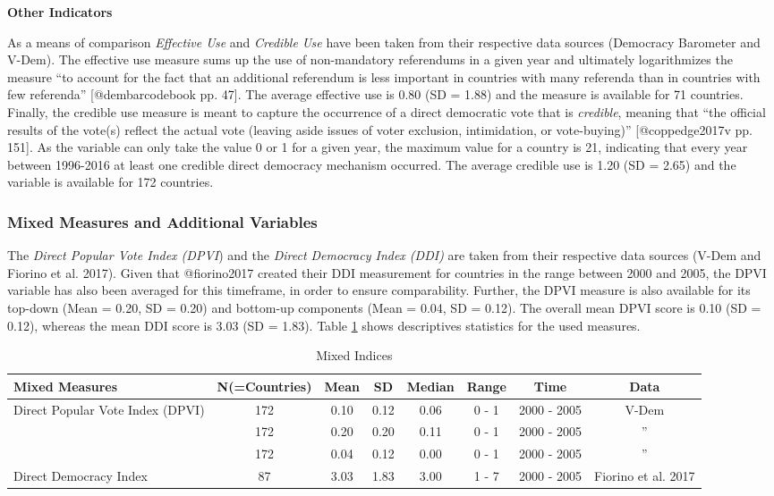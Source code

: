 \documentclass[]{article}
\begin{document}
\textbf{Other Indicators}

As a means of comparison \emph{Effective Use} and \emph{Credible Use}
have been taken from their respective data sources (Democracy Barometer
and V-Dem). The effective use measure sums up the use of non-mandatory
referendums in a given year and ultimately logarithmizes the measure
``to account for the fact that an additional referendum is less
important in countries with many referenda than in countries with few
referenda'' {[}@dembarcodebook pp. 47{]}. The average effective use is
0.80 (SD = 1.88) and the measure is available for 71 countries. Finally,
the credible use measure is meant to capture the occurrence of a direct
democratic vote that is \emph{credible}, meaning that ``the official
results of the vote(s) reflect the actual vote (leaving aside issues of
voter exclusion, intimidation, or vote-buying)'' {[}@coppedge2017v pp.
151{]}. As the variable can only take the value 0 or 1 for a given year,
the maximum value for a country is 21, indicating that every year
between 1996-2016 at least one credible direct democracy mechanism
occurred. The average credible use is 1.20 (SD = 2.65) and the variable
is available for 172 countries.

\subsubsection{Mixed Measures and Additional
Variables}\label{mixed-measures-and-additional-variables}

The \emph{Direct Popular Vote Index (DPVI}) and the \emph{Direct
Democracy Index (DDI)} are taken from their respective data sources
(V-Dem and Fiorino et al. 2017). Given that @fiorino2017 created their
DDI measurement for countries in the range between 2000 and 2005, the
DPVI variable has also been averaged for this timeframe, in order to
ensure comparability. Further, the DPVI measure is also available for
its top-down (Mean = 0.20, SD = 0.20) and bottom-up components (Mean =
0.04, SD = 0.12). The overall mean DPVI score is 0.10 (SD = 0.12),
whereas the mean DDI score is 3.03 (SD = 1.83). Table \ref{mixed_table}
shows descriptives statistics for the used measures.

\begin{table}[ht]
\centering
\caption{Mixed Indices}
\label{mixed_table}
\resizebox{\textwidth}{!}
{\begin{tabular}{lccccccc}
  \toprule
\textbf{Mixed Measures} & \textbf{N(=Countries)} & \textbf{Mean} & \textbf{SD} & \textbf{Median} & \textbf{Range} & \textbf{Time} & \textbf{Data} \\ 
  \midrule
Direct Popular Vote Index (DPVI) & 172 & 0.10 & 0.12 & 0.06 & 0 - 1 & 2000 - 2005 & V-Dem \\ 
  \hskip .5cm \textit{Top-Down} & 172 & 0.20 & 0.20 & 0.11 & 0 - 1 & 2000 - 2005 & '' \\ 
  \hskip .5cm \textit{Bottom-Up} & 172 & 0.04 & 0.12 & 0.00 & 0 - 1 & 2000 - 2005 & '' \\ 
  Direct Democracy Index & 87 & 3.03 & 1.83 & 3.00 & 1 - 7 & 2000 - 2005 & Fiorino et al. 2017 \\ 
   \bottomrule
\end{tabular}}
\end{table}
\end{document}
